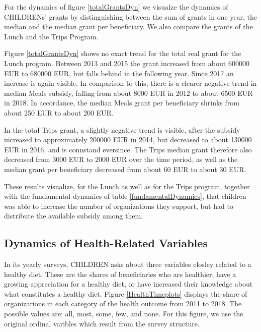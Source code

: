 \documentclass[12pt, a4paper, titlepage]{article}\usepackage[]{graphicx}\usepackage[]{color}
\begin{document}
For the dynamics of figure \ref{totalGrantsDyn} we visualze the dynamics of CHILDRENs' grants by distinguishing between the sum of grants in one year, the median and the median grant per beneficiary. We also compare the grants of the Lunch and the Trips Program.

Figure \ref{totalGrantsDyn} shows no exact trend for the total real grant for the Lunch program. Between 2013 and 2015 the grant increased from about 600000 EUR to 680000 EUR, but falls behind in the following year. Since 2017 an increase is again visible. In comparison to this, there is a clearer negative trend in median Meals subsidy, falling from about 8000 EUR in 2012 to about 6500 EUR in 2018. In accordance, the median Meals grant per beneficiary shrinks from about 250 EUR to about 200 EUR. 

In the total Trips grant, a slightly negative trend is visible, after the subsidy increased to approximately 200000 EUR in 2014, but decreased to about 130000 EUR in 2016, and is connstand eversince. The Trips median grant therefore also decreased from 3000 EUR to 2000 EUR over the time period, as well as the median grant per beneficiary decreased from about 60 EUR to about 30 EUR.

These results visualize, for the Lunch as well as for the Trips program, together with the fundamental dynamics of table \ref{fundamentalDynamics}, that children was able to increase the number of organizations they support, but had to distribute the available subsidy among them. 

\subsection{Dynamics of Health-Related Variables} 

In its yearly surveys, CHILDREN asks about three variables closley related to a healthy diet. These are the shares of beneficiaries who are healthier, have a growing appreciation for a healthy diet, or have increased their knowledge about what constitutes a healthy diet. Figure \ref{HealthTimeplots} displays the share of organizarions in each category of the health outcome from 2011 to 2018. The possible values are: all, most, some, few, and none. For this figure, we use the original ordinal varibles which result from the survey structure.  
\end{document}

